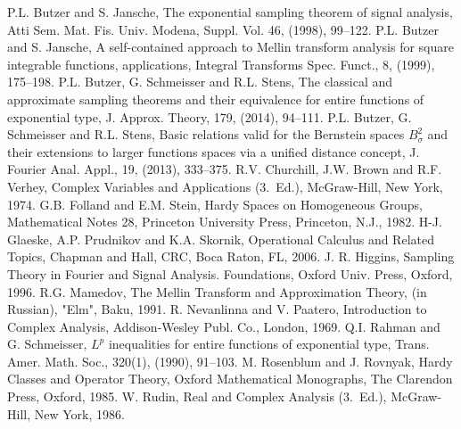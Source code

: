 \documentclass[amsmath,english,a4paper,graphicx,12pt]{article}
\begin{document}
\begin{thebibliography}{99}
 P.L. Butzer and S. Jansche, The exponential sampling theorem of signal analysis, 
Atti Sem. Mat. Fis. Univ. Modena, Suppl. Vol. 46, (1998), 99--122.
 P.L. Butzer and S. Jansche, A self-contained approach to Mellin transform analysis for square integrable functions, applications, 
Integral Transforms Spec. Funct., 8, (1999), 175--198.
 P.L. Butzer, G. Schmeisser and R.L. Stens, The classical and approximate sampling theorems and their equivalence for entire functions 
of exponential type, J. Approx. Theory, 179, (2014), 94--111.
  P.L. Butzer, G. Schmeisser and R.L. Stens, Basic relations valid for the Bernstein spaces $B^2_\sigma$ and their extensions to larger 
functions spaces via a unified distance concept, J. Fourier Anal. Appl., 19, (2013), 333--375.
 R.V. Churchill, J.W. Brown and R.F. Verhey, Complex Variables and Applications (3.~Ed.), McGraw-Hill, New York, 1974.
 G.B. Folland and E.M. Stein,  Hardy Spaces on Homogeneous Groups, Mathematical Notes 28, 
Princeton University Press, Princeton, N.J., 1982.
 H-J. Glaeske, A.P. Prudnikov and K.A. Skornik, Operational Calculus and Related Topics, Chapman and Hall, CRC, Boca Raton, FL, 2006.
 J. R. Higgins, Sampling Theory in Fourier and Signal Analysis. Foundations, Oxford Univ. Press, Oxford, 1996.
 R.G. Mamedov, The Mellin Transform and Approximation Theory, (in Russian), "Elm", Baku, 1991.
 R. Nevanlinna and V. Paatero, Introduction to Complex Analysis, Addison-Wesley Publ. Co., London, 1969.
 Q.I. Rahman and G. Schmeisser, $L^p$ inequalities for entire functions of exponential type, Trans. Amer. Math. Soc., 320(1), (1990), 91--103.
 M. Rosenblum and J. Rovnyak, Hardy Classes and Operator Theory, Oxford Mathematical Monographs,  
The Clarendon Press, Oxford, 1985.
 W. Rudin, Real and Complex Analysis (3.~Ed.), McGraw-Hill, New York, 1986.

\end{thebibliography}
\end{document}
